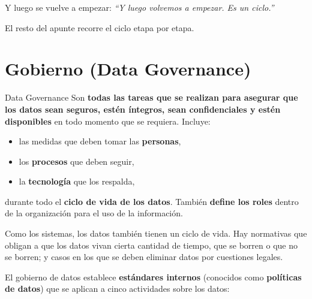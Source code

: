 \documentclass[11pt,a4paper]{article}
\newcommand{\prof}[1]{%
  \medskip\noindent\hspace*{1em}\textit{``#1''}\\[-1pt]%
  \hspace*{1em}{\footnotesize\textcolor{black!55}{--- Prof.\ Leandro Suárez (clase teórica)}}\medskip}
\begin{document}
\noindent Y luego se vuelve a empezar: \prof{Y luego volvemos a empezar. Es un ciclo.}

\noindent El resto del apunte recorre el ciclo etapa por etapa.

\section{Gobierno (Data Governance)}

\begin{defbox}{Data Governance}
Son \textbf{todas las tareas que se realizan para asegurar que los datos sean seguros,
estén íntegros, sean confidenciales y estén disponibles} en todo momento que se requiera.
Incluye:
\begin{itemize}[leftmargin=1.4em,itemsep=1pt,topsep=2pt]
  \item las medidas que deben tomar las \textbf{personas},
  \item los \textbf{procesos} que deben seguir,
  \item la \textbf{tecnología} que los respalda,
\end{itemize}
durante todo el \textbf{ciclo de vida de los datos}. También \textbf{define los roles}
dentro de la organización para el uso de la información.
\end{defbox}

Como los sistemas, los datos también tienen un ciclo de vida. Hay normativas que obligan a
que los datos vivan cierta cantidad de tiempo, que se borren o que no se borren; y casos en
los que se deben eliminar datos por cuestiones legales.

El gobierno de datos establece \textbf{estándares internos} (conocidos como
\textbf{políticas de datos}) que se aplican a cinco actividades sobre los datos:

\begin{center}
\end{center}
\end{document}
